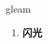 
\begin{frame}
{\huge gleam}
\begin{center}
\begin{enumerate}\Large
  \item \textbf{闪光}
\end{enumerate}
\end{center}
\end{frame}
